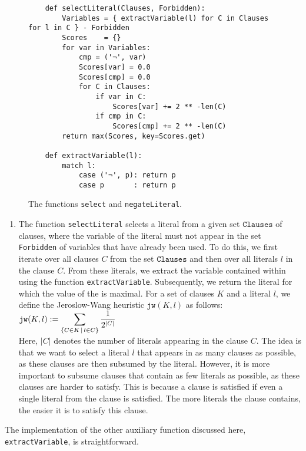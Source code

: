 \begin{figure}[!ht]
  \centering
\begin{verbatim}
    def selectLiteral(Clauses, Forbidden):
        Variables = { extractVariable(l) for C in Clauses for l in C } - Forbidden
        Scores    = {} 
        for var in Variables:
            cmp = ('¬', var)
            Scores[var] = 0.0
            Scores[cmp] = 0.0
            for C in Clauses:
                if var in C:
                    Scores[var] += 2 ** -len(C)
                if cmp in C: 
                    Scores[cmp] += 2 ** -len(C)
        return max(Scores, key=Scores.get)

    def extractVariable(l):
        match l:
            case ('¬', p): return p
            case p       : return p
\end{verbatim}
\vspace*{-0.3cm}
  \caption{The functions \texttt{select} and \texttt{negateLiteral}.}
  \label{fig:solve-aux}
\end{figure}
\begin{enumerate}
\item The function \texttt{selectLiteral} selects a literal from 
a given set $\texttt{Clauses}$ of clauses, where the variable of the literal must not appear in the set
\texttt{Forbidden} of variables that have already been used.
To do this, we first iterate over all clauses $C$ from the set $\texttt{Clauses}$ and then over all literals $l$
in the clause $C$. From these literals, we extract the variable contained within using the function
\texttt{extractVariable}. Subsequently, we return the literal for which the value of the
  \cite{jeroslow:1990} is maximal. For a
set of clauses $K$ and a 
literal $l$, we define the Jeroslow-Wang heuristic $\texttt{jw}(K, l)$ as follows:
\\[0.2cm]
\hspace*{1.3cm}
$\displaystyle\mathtt{jw}(K, l) := \sum\limits_{\{C \in K \,\mid\, l \in C\}} \frac{1}{2^{|C|}}$
\\[0.2cm]
Here, $|C|$ denotes the number of literals appearing in the clause $C$. The idea is that we
want to select a literal $l$ that appears in as many clauses as possible, as these clauses are then
subsumed by the literal. However, it is more important to subsume clauses that contain as few
literals as possible, as these clauses are harder to satisfy. This is because a clause
is satisfied if even a single literal from the clause is satisfied. The more literals the
clause contains, the easier it is to satisfy this clause.
\end{enumerate}
The implementation of the other auxiliary function discussed here, \texttt{extractVariable}, is
straightforward.

